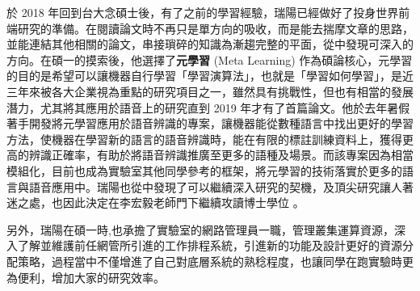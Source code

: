 \documentclass[14pt,UTF8,fntef]{memoir}
\begin{document}
於 2018 年回到台大念碩士後，有了之前的學習經驗，瑞陽已經做好了投身世界前端研究的準備。在閱讀論文時不再只是單方向的吸收，而是能去揣摩文章的思路，並能連結其他相關的論文，串接瑣碎的知識為漸趨完整的平面，從中發現可深入的方向。在碩一的摸索後，他選擇了\textbf{元學習} (Meta Learning) 作為碩論核心，元學習的目的是希望可以讓機器自行學習「學習演算法」，也就是「學習如何學習」，是近三年來被各大企業視為重點的研究項目之一，雖然具有挑戰性，但也有相當的發展潛力，尤其將其應用於語音上的研究直到 2019 年才有了首篇論文。他於去年暑假著手開發將元學習應用於語音辨識的專案，讓機器能從數種語言中找出更好的學習方法，使機器在學習新的語言的語音辨識時，能在有限的標註訓練資料上，獲得更高的辨識正確率，有助於將語音辨識推廣至更多的語種及場景。而該專案因為相當模組化，目前也成為實驗室其他同學參考的框架，將元學習的技術落實於更多的語言與語音應用中。瑞陽也從中發現了可以繼續深入研究的契機，及頂尖研究讓人著迷之處，也因此決定在李宏毅老師門下繼續攻讀博士學位
。

\vspace{1.5em}

另外，瑞陽在碩一時,也承擔了實驗室的網路管理員一職，管理叢集運算資源，深入了解並維護前任網管所引進的工作排程系統，引進新的功能及設計更好的資源分配策略，過程當中不僅增進了自己對底層系統的熟稔程度，也讓同學在跑實驗時更為便利，增加大家的研究效率。
\end{document}
